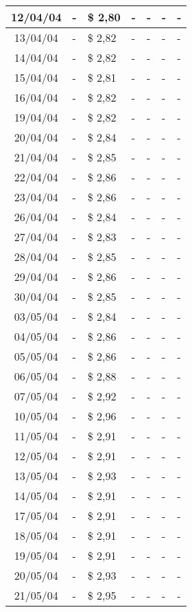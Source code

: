 \begin{center}
\begin{longtable}{|c|p{1.5cm}|p{1.5cm}|p{1.5cm}|p{1.5cm}|p{1.5cm}|p{1.5cm}|}
12/04/04 & - & \$ 2,80 & - & - & - & - \\ \hline
13/04/04 & - & \$ 2,82 & - & - & - & - \\ \hline
14/04/04 & - & \$ 2,82 & - & - & - & - \\ \hline
15/04/04 & - & \$ 2,81 & - & - & - & - \\ \hline
16/04/04 & - & \$ 2,82 & - & - & - & - \\ \hline
19/04/04 & - & \$ 2,82 & - & - & - & - \\ \hline
20/04/04 & - & \$ 2,84 & - & - & - & - \\ \hline
21/04/04 & - & \$ 2,85 & - & - & - & - \\ \hline
22/04/04 & - & \$ 2,86 & - & - & - & - \\ \hline
23/04/04 & - & \$ 2,86 & - & - & - & - \\ \hline
26/04/04 & - & \$ 2,84 & - & - & - & - \\ \hline
27/04/04 & - & \$ 2,83 & - & - & - & - \\ \hline
28/04/04 & - & \$ 2,85 & - & - & - & - \\ \hline
29/04/04 & - & \$ 2,86 & - & - & - & - \\ \hline
30/04/04 & - & \$ 2,85 & - & - & - & - \\ \hline
03/05/04 & - & \$ 2,84 & - & - & - & - \\ \hline
04/05/04 & - & \$ 2,86 & - & - & - & - \\ \hline
05/05/04 & - & \$ 2,86 & - & - & - & - \\ \hline
06/05/04 & - & \$ 2,88 & - & - & - & - \\ \hline
07/05/04 & - & \$ 2,92 & - & - & - & - \\ \hline
10/05/04 & - & \$ 2,96 & - & - & - & - \\ \hline
11/05/04 & - & \$ 2,91 & - & - & - & - \\ \hline
12/05/04 & - & \$ 2,91 & - & - & - & - \\ \hline
13/05/04 & - & \$ 2,93 & - & - & - & - \\ \hline
14/05/04 & - & \$ 2,91 & - & - & - & - \\ \hline
17/05/04 & - & \$ 2,91 & - & - & - & - \\ \hline
18/05/04 & - & \$ 2,91 & - & - & - & - \\ \hline
19/05/04 & - & \$ 2,91 & - & - & - & - \\ \hline
20/05/04 & - & \$ 2,93 & - & - & - & - \\ \hline
21/05/04 & - & \$ 2,95 & - & - & - & - \\ \hline

\end{longtable}
\end{center}

